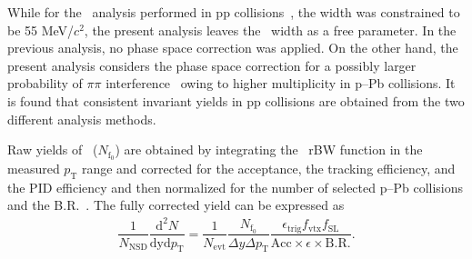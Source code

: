 While for the \fzero~analysis performed in pp collisions~\cite{ALICE:2022qnb}, the width was constrained to be 55 MeV/$c^{2}$, the present analysis leaves the \fzero~width as a free parameter. In the previous analysis, no phase space correction was applied. On the other hand, the present analysis considers the phase space correction for a possibly larger probability of $\pi\pi$ interference~\cite{STAR:2003vqj} owing to higher multiplicity in p--Pb collisions. It is found that consistent invariant yields in pp collisions are obtained from the two different analysis methods.

Raw yields of \fzero~($N_{\mathrm{f}_{0}}$) are obtained by integrating the \fzero~rBW function in the measured $p_{\mathrm{T}}$ range and corrected for the acceptance, the tracking efficiency, and the PID efficiency and then normalized for the number of selected p--Pb collisions and the B.R.~\cite{Stone:2013eaa}. The fully corrected yield can be expressed as
\begin{eqnarray}
\dfrac{1}{N_{\mathrm{NSD}}}\dfrac{\mathrm{d}^{2}N}{\mathrm{dyd}p_{\mathrm{T}}} = \dfrac{1}{N_{\mathrm{evt}}} \dfrac{ N_{\mathrm{f}_{0}} }{ \Delta y \Delta p_{\mathrm{T}} } \dfrac{  \epsilon_{\mathrm{trig}} f_{\mathrm{vtx}} f_{\mathrm{SL}} }{\mathrm{Acc} \times \epsilon \times \mathrm{B.R.} }.
\end{eqnarray}
